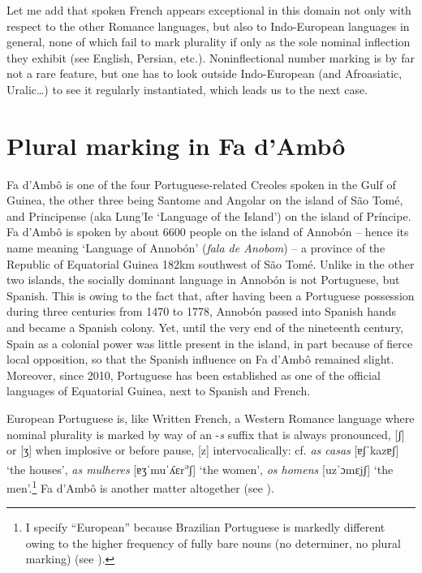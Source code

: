 \documentclass[output=paper]{langscibook}
\begin{document}
Let me add that spoken French appears exceptional in this domain not only with respect to the other Romance languages, but also to Indo-European languages in general, none of which fail to mark plurality if only as the sole nominal inflection they exhibit (see English, Persian, etc.). Noninflectional number marking is by far not a rare feature, but one has to look outside Indo-European (and Afroasiatic, Uralic…) to see it regularly instantiated, which leads us to the next case.

\section{Plural marking in Fa d’Ambô}
\label{sec:kihm:3}

Fa d’Ambô is one of the four Portuguese-related Creoles spoken in the Gulf of Guinea, the other three being Santome and Angolar on the island of São Tomé, and Principense (aka Lung’Ie ‘Language of the Island’) on the island of Príncipe. Fa d’Ambô is spoken by about 6600 people on the island of Annobón -- hence its name meaning ‘Language of Annobón’ (\textit{fala de Anobom}) -- a province of the Republic of Equatorial Guinea 182km southwest of São Tomé. Unlike in the other two islands, the socially dominant language in Annobón is not Portuguese, but Spanish. This is owing to the fact that, after having been a Portuguese possession during three centuries from 1470 to 1778, Annobón passed into Spanish hands and became a Spanish colony. Yet, until the very end of the nineteenth century, Spain as a colonial power was little present in the island, in part because of fierce local opposition, so that the Spanish influence on Fa d’Ambô remained slight. Moreover, since 2010, Portuguese has been established as one of the official languages of Equatorial Guinea, next to Spanish and French.

European Portuguese is, like Written French, a Western Romance language where nominal plurality is marked by way of an -\textit{s} suffix that is always pronounced, [ʃ] or [ʒ] when implosive or before pause, [z] intervocalically: cf. \textit{as casas} [ɐʃˈkazɐʃ] ‘the houses’, \textit{as mulheres} [ɐʒˈmuˈʎɛr\textsuperscript{ə}ʃ] ‘the women’, \textit{os homens} [uzˈɔmɛjʃ] ‘the men’.\footnote{I specify “European” because Brazilian Portuguese is markedly different owing to the higher frequency of fully bare nouns (no determiner, no plural marking) (see \citealt{BritoLopes2016}).} Fa d’Ambô is another matter altogether (see \citealt[35--38]{HagemeijerEtAl2020}).
\end{document}
